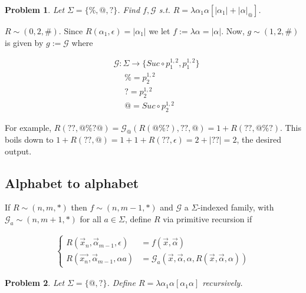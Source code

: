 \documentclass[a4paper, 12pt]{article}
\newtheorem{problem}{Problem}
\newtheorem{problem}{Problem}
\begin{document}
\begin{problem}
    Let $\Sigma = \{\%, @, ?\}$. Find $f, \mathcal{G}$ s.t. $R = \lambda \alpha_1
    \alpha \left[ |\alpha_1| + |\alpha|_{@} \right] $.
\end{problem}

$R \sim (0, 2, \#)$. Since $R(\alpha_1, \epsilon) = | \alpha_1|$ we let $f :=
\lambda \alpha = |\alpha|$. Now, $g \sim (1, 2, \#)$ is given by $g :=
\mathcal{G}$ where 

\begin{align*}
    &\mathcal{G} : \Sigma \to \{ Suc \circ p_1^{1, 2}, p_1^{1, 2}  \} \\ 
    &~ ~ ~ ~ ~ ~  \% = p_{2}^{1, 2}\\
    &~ ~ ~ ~ ~ ~  ? = p_{2}^{1, 2}\\
    &~ ~ ~ ~ ~ ~  @ = Suc \circ p_{2}^{1, 2}
\end{align*}

For example, $R(??, @\%?@) = \mathcal{G}_{@} \left( R(@\%?), ??, @ \right) = 1 +
R(??, @\%?) $. This boils down to $1 + R(??, @) = 1 + 1 + R(??, \epsilon) = 2 +
|??| = 2$, the desired output.

\pagebreak 

\subsection{Alphabet to alphabet}

If $R \sim (n, m, *)$ then $f \sim (n, m-1, *)$ and $\mathcal{G}$ a $\Sigma$-indexed
family, with $\mathcal{G}_a \sim (n, m+1, *)$ for all $a\in \Sigma$, define $R$
via primitive recursion if 

\begin{align*}
    \begin{cases}
        R(\overrightarrow{x}_n, \overrightarrow{\alpha}_{m-1}, \epsilon) &=
        f(\overrightarrow{x}, \overrightarrow{\alpha}) \\ 
        R(\overrightarrow{x_n}, \overrightarrow{\alpha}_{m-1}, \alpha a)&= \mathcal{G}_a
        \left( \overrightarrow{x}, \overrightarrow{\alpha},
        \alpha, R(\overrightarrow{x}, \overrightarrow{\alpha}, \alpha) \right) 
    \end{cases}
\end{align*}

\begin{problem}
    Let $\Sigma = \{ @, ? \}$. Define $R = \lambda \alpha_1 \alpha [ \alpha_1
    \alpha ]$ recursively.
\end{problem}
\end{document}
